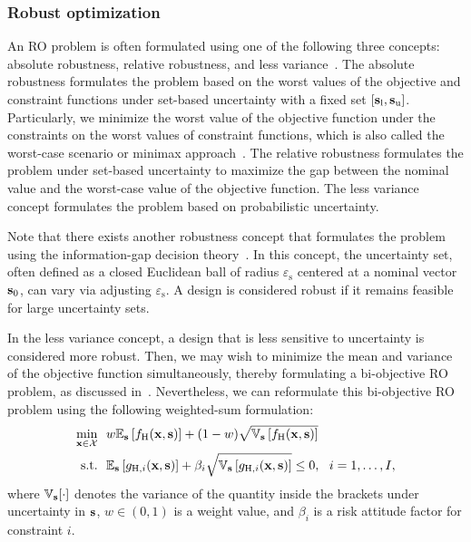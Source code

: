 \documentclass[journal ]{new-aiaa}
\begin{document}
\subsubsection{Robust optimization}\label{Sec631}

An RO problem is often formulated using one of the following three concepts: absolute robustness, relative robustness, and less variance~\citep{Kanno2020}.
The absolute robustness formulates the problem based on the worst values of the objective and constraint functions under set-based uncertainty with a fixed set $[{\bf s}_\text{l},{\bf s}_\text{u}]$.
Particularly, we minimize the worst value of the objective function under the constraints on the worst values of constraint functions, which is also called the worst-case scenario or minimax approach~\citep[see e.g.,][]{BenTal2009,Elishakoff2010}.
The relative robustness formulates the problem under set-based uncertainty to maximize the gap between the nominal value and the worst-case value of the objective function.
The less variance concept formulates the problem based on probabilistic uncertainty.

Note that there exists another robustness concept that formulates the problem using the information-gap decision theory~\citep{Hemez2004}.
In this concept, the uncertainty set, often defined as a closed Euclidean ball of radius $\varepsilon_\text{s}$ centered at a nominal vector ${\bf s}_0$, can vary via adjusting $\varepsilon_\text{s}$.  
A design is considered robust if it remains feasible for large uncertainty sets.

In the less variance concept, a design that is less sensitive to uncertainty is considered more robust.
Then, we may wish to minimize the mean and variance of the objective function simultaneously, thereby formulating a
bi-objective RO problem, as discussed in~.
Nevertheless, we can reformulate this bi-objective RO problem using the following weighted-sum formulation:
\begin{equation}\label{eqn66}
	\begin{aligned}
		\underset{{\bf x} \in \mathcal{X}}{\min} \ \ & w \mathbb{E}_{\bf s}\left[f_\text{H}({\bf x},{\bf s})\right]+(1-w)\sqrt{\mathbb{V}_{\bf s}\left[f_\text{H}({\bf x},{\bf s})\right]}\\
		\textrm{s.t.} \ \ 
		&\mathbb{E}_{\bf s}\left[g_{\text{H},i}({\bf x},{\bf s})\right] 
		+ \beta_i \sqrt{\mathbb{V}_{\bf s}\left[g_{\text{H},i}({\bf x},{\bf s})\right]} \leq 0, \ \ i=1,\dots,I, 
	\end{aligned}
\end{equation}
where $\mathbb{V}_{\bf s}[\cdot]$ denotes the variance of the quantity inside the brackets under uncertainty in ${\bf s}$, $w \in (0,1)$ is a weight value, and $\beta_i$ is a risk attitude factor for constraint $i$.
\end{document}
